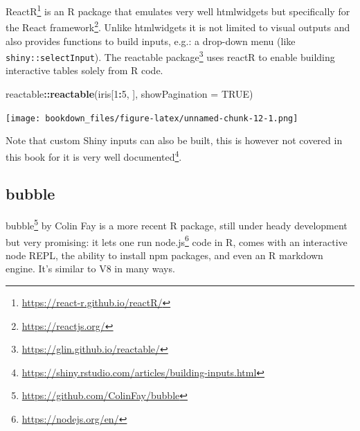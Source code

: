 \documentclass[
]{krantz}
\makeatletter
\newenvironment{Shaded}{\begin{snugshade}}{\end{snugshade}}
\newcommand{\CommentTok}[1]{\textcolor[rgb]{0.37,0.37,0.37}{\textit{#1}}}
\newcommand{\DataTypeTok}[1]{\textcolor[rgb]{0.27,0.27,0.27}{#1}}
\newcommand{\DecValTok}[1]{\textcolor[rgb]{0.06,0.06,0.06}{#1}}
\newcommand{\KeywordTok}[1]{\textcolor[rgb]{0.27,0.27,0.27}{\textbf{#1}}}
\newcommand{\NormalTok}[1]{#1}
\newcommand{\OperatorTok}[1]{\textcolor[rgb]{0.43,0.43,0.43}{\textbf{#1}}}
\newcommand{\OtherTok}[1]{\textcolor[rgb]{0.37,0.37,0.37}{#1}}
\newcommand{\StringTok}[1]{\textcolor[rgb]{0.5,0.5,0.5}{#1}}
\renewcommand{\href}[2]{#2\footnote{\url{#1}}}
\newenvironment{kframe}{%
\medskip{}
\setlength{\fboxsep}{.8em}
 \def\at@end@of@kframe{}%
 \ifinner\ifhmode%
  \def\at@end@of@kframe{\end{minipage}}%
  \begin{minipage}{\columnwidth}%
 \fi\fi%
 \def\FrameCommand##1{\hskip\@totalleftmargin \hskip-\fboxsep
 \colorbox{shadecolor}{##1}\hskip-\fboxsep
     \hskip-\linewidth \hskip-\@totalleftmargin \hskip\columnwidth}%
 \MakeFramed {\advance\hsize-\width
   \@totalleftmargin\z@ \linewidth\hsize
   \@setminipage}}%
 {\par\unskip\endMakeFramed%
 \at@end@of@kframe}
\renewenvironment{Shaded}{\begin{kframe}}{\end{kframe}}
\makeatother
\begin{document}
\href{https://react-r.github.io/reactR/}{ReactR} \citep{R-reactR} is an R package that emulates very well htmlwidgets but specifically for the \href{https://reactjs.org/}{React framework}. Unlike htmlwidgets it is not limited to visual outputs and also provides functions to build inputs, e.g.: a drop-down menu (like \texttt{shiny::selectInput}). The \href{https://glin.github.io/reactable/}{reactable package} \citep{R-reactable} uses reactR to enable building interactive tables solely from R code.

\begin{Shaded}
\begin{Highlighting}[]
\NormalTok{reactable}\OperatorTok{::}\KeywordTok{reactable}\NormalTok{(iris[}\DecValTok{1}\OperatorTok{:}\DecValTok{5}\NormalTok{, ], }\DataTypeTok{showPagination =} \OtherTok{TRUE}\NormalTok{)}
\end{Highlighting}
\end{Shaded}

\texttt{[image: bookdown\_files/figure-latex/unnamed-chunk-12-1.png]}

Note that custom Shiny inputs can also be built, this is however not covered in this book for it is very well \href{https://shiny.rstudio.com/articles/building-inputs.html}{documented}.

\hypertarget{bubble}{%
\subsection*{bubble}\label{bubble}}


\href{https://github.com/ColinFay/bubble}{bubble} \citep{R-bubble} by Colin Fay is a more recent R package, still under heady development but very promising: it lets one run \href{https://nodejs.org/en/}{node.js} code in R, comes with an interactive node REPL, the ability to install npm packages, and even an R markdown engine. It's similar to V8 in many ways.

\begin{Shaded}
\end{Shaded}
\end{document}

